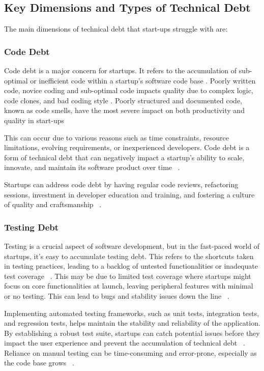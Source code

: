 \documentclass[manuscript]{acmart}
\begin{document}
\subsection{Key Dimensions and Types of Technical Debt}
The main dimensions of technical debt that start-ups struggle with are:

\subsubsection{Code Debt} 
Code debt is a major concern for startups. It refers to the accumulation of sub-optimal or inefficient code within a startup's software code base . Poorly written code, novice coding and sub-optimal code impacts quality due to complex logic, code clones, and bad coding style . Poorly structured and documented code, known as code smells, have the most severe impact on both productivity and quality in start-ups ~\cite{Klotins2018/3183519.3183539}

This can occur due to various reasons such as time constraints, resource limitations, evolving requirements, or inexperienced developers. Code debt is a form of technical debt that can negatively impact a startup's ability to scale, innovate, and maintain its software product over time ~\cite{FowlerBottlenecks, Qualityv77:online}.

Startups can address code debt by having regular code reviews, refactoring sessions, investment in developer education and training, and fostering a culture of quality and craftsmanship ~\cite{10043622, Acknowle63:online}.

\subsubsection{Testing Debt}
Testing is a crucial aspect of software development, but in the fast-paced world of startups, it's easy to accumulate testing debt. This refers to the shortcuts taken in testing practices, leading to a backlog of untested functionalities or inadequate test coverage  ~\cite{Howtohan98:online}. This may be due to limited test coverage where startups might focus on core functionalities at launch, leaving peripheral features with minimal or no testing. This can lead to bugs and stability issues down the line ~\cite{Totalqua26:online}.

Implementing automated testing frameworks, such as unit tests, integration tests, and regression tests, helps maintain the stability and reliability of the application. By establishing a robust test suite, startups can catch potential issues before they impact the user experience and prevent the accumulation of technical debt ~\cite{TheImpac54:online}. Reliance on manual testing can be time-consuming and error-prone, especially as the code base grows ~\cite{Howtohan98:online}.
\end{document}
